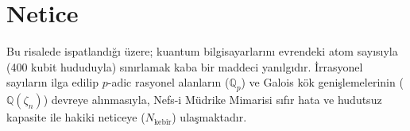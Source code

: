 \documentclass[11pt, a4paper]{article}
\begin{document}
\section{Netice}

Bu risalede ispatlandığı üzere; kuantum bilgisayarlarını evrendeki atom sayısıyla (400 kubit hududuyla) sınırlamak kaba bir maddeci yanılgıdır. İrrasyonel sayıların ilga edilip $p$-adic rasyonel alanların ($\mathbb{Q}_p$) ve Galois kök genişlemelerinin ($\mathbb{Q}(\zeta_n)$) devreye alınmasıyla, Nefs-i Müdrike Mimarisi sıfır hata ve hudutsuz kapasite ile hakiki neticeye ($N_{\text{kebîr}}$) ulaşmaktadır.
\end{document}
